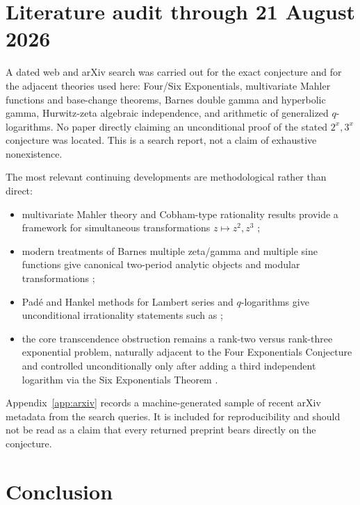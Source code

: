 \documentclass[11pt]{article}
\numberwithin{equation}{section}
\theoremstyle{definition}
\theoremstyle{remark}
\begin{document}
\section{Literature audit through 21 August 2026}
\label{sec:literature}

A dated web and arXiv search was carried out for the exact conjecture and for the adjacent theories used here: Four/Six Exponentials, multivariate Mahler functions and base-change theorems, Barnes double gamma and hyperbolic gamma, Hurwitz-zeta algebraic independence, and arithmetic of generalized $q$-logarithms.  No paper directly claiming an unconditional proof of the stated $2^x,3^x$ conjecture was located.  This is a search report, not a claim of exhaustive nonexistence.

The most relevant continuing developments are methodological rather than direct:
\begin{itemize}
\item multivariate Mahler theory and Cobham-type rationality results provide a framework for simultaneous transformations $z\mapsto z^2,z^3$ \cite{AdamczewskiBell,AdamczewskiFaverjonI,AdamczewskiFaverjonII};
\item modern treatments of Barnes multiple zeta/gamma and multiple sine functions give canonical two-period analytic objects and modular transformations \cite{Ruijsenaars2000,Narukawa2004};
\item Pad\'e and Hankel methods for Lambert series and $q$-logarithms give unconditional irrationality statements such as  \cite{Borwein1992,BundschuhVaananen1994};
\item the core transcendence obstruction remains a rank-two versus rank-three exponential problem, naturally adjacent to the Four Exponentials Conjecture and controlled unconditionally only after adding a third independent logarithm via the Six Exponentials Theorem \cite{Lang1966,Waldschmidt2000}.
\end{itemize}

Appendix~\ref{app:arxiv} records a machine-generated sample of recent arXiv metadata from the search queries.  It is included for reproducibility and should not be read as a claim that every returned preprint bears directly on the conjecture.

\section{Conclusion}
\label{sec:conclusion}
\end{document}
